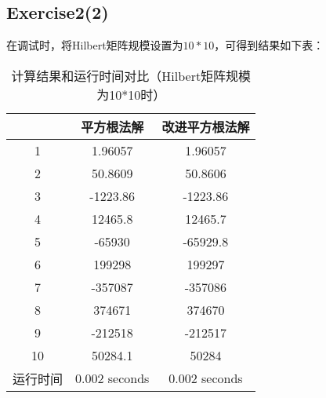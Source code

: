 \documentclass{article}
\begin{document}
\subsection*{Exercise2(2)}
在调试时，将Hilbert矩阵规模设置为$10*10$，可得到结果如下表：
\begin{table}[H]
	\centering
	\begin{tabular}{ccc}
		\toprule
		& \textbf{平方根法解} & \textbf{改进平方根法解} \\
		\midrule
		1& 1.96057        & 1.96057          \\
		2& 50.8609        & 50.8606          \\
		3& -1223.86       & -1223.86         \\
		4& 12465.8        & 12465.7          \\
		5& -65930         & -65929.8         \\
		6& 199298         & 199297           \\
		7& -357087        & -357086          \\
		8& 374671         & 374670           \\
		9& -212518        & -212517          \\
		10& 50284.1        & 50284            \\
		运行时间 & 0.002 seconds & 0.002 seconds  \\
		\bottomrule
	\end{tabular}
	\caption{计算结果和运行时间对比（Hilbert矩阵规模为10*10时）}
\end{table}
\end{document}
